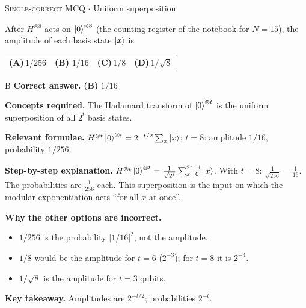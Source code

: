 \documentclass[11pt,a4paper]{article}
\newcommand{\optlabel}[1]{\textbf{(#1)}}
\newcommand{\correctlabel}[1]{\textcolor{okgreen}{\textbf{(#1)}\,\ding{51}}}
\newenvironment{qitem}[1]{\begin{list}{}{\setlength{\leftmargin}{3.3em}\setlength{\labelwidth}{3.1em}%
  \setlength{\labelsep}{0.2em}\setlength{\topsep}{3pt}\setlength{\parsep}{3pt}}\item[\textbf{Q.#1}\hfill]}{\end{list}}
\newcommand{\qsep}{\par\vspace{2pt}{\color{black!15}\hrule}\vspace{4pt}}
\newcommand{\qmeta}[2]{{\footnotesize\color{black!60}\textsc{#1} \;$\cdot$\; #2}\par}
\begin{document}
\begin{qitem}{21}
\qmeta{Single-correct MCQ}{Uniform superposition}
After $H^{\otimes8}$ acts on $\ket{0}^{\otimes8}$ (the counting register of the notebook for $N = 15$), the amplitude of each basis state $\ket x$ is
\par\smallskip\noindent\begin{tabularx}{\linewidth}{@{}*{4}{L}@{}}
\optlabel{A}\,$1/256$ & \correctlabel{B}\,$1/16$ & \optlabel{C}\,$1/8$ & \optlabel{D}\,$1/\sqrt8$
\end{tabularx}
\end{qitem}
\begin{solbox}{B}
\textbf{\color{brand}Correct answer.} \textcolor{okgreen}{\textbf{(B)}} $1/16$

\textbf{\color{brand}Concepts required.} The Hadamard transform of $\ket0^{\otimes t}$ is the uniform superposition of all $2^t$ basis states.

\textbf{\color{brand}Relevant formulae.} $H^{\otimes t}\ket0^{\otimes t} = 2^{-t/2}\sum_x\ket x$; $t = 8$: amplitude $1/16$, probability $1/256$.

\textbf{\color{brand}Step-by-step explanation.} $H^{\otimes t}\ket{0}^{\otimes t} = \frac{1}{\sqrt{2^t}}\sum_{x=0}^{2^t-1}\ket x$. With $t = 8$: $\frac{1}{\sqrt{256}} = \frac1{16}$. The probabilities are $\frac{1}{256}$ each.
This superposition is the input on which the modular exponentiation acts ``for all $x$ at once''.

\textbf{\color{brand}Why the other options are incorrect.}
\begin{itemize}[leftmargin=2.4em, itemsep=1pt, topsep=2pt]
\item[\textbf{(A)}] $1/256$ is the probability $|1/16|^2$, not the amplitude.
\item[\textbf{(C)}] $1/8$ would be the amplitude for $t = 6$ ($2^{-3}$); for $t = 8$ it is $2^{-4}$.
\item[\textbf{(D)}] $1/\sqrt8$ is the amplitude for $t = 3$ qubits.
\end{itemize}
\textbf{\color{brand}Key takeaway.} Amplitudes are $2^{-t/2}$; probabilities $2^{-t}$.
\end{solbox}
\qsep
\end{document}
